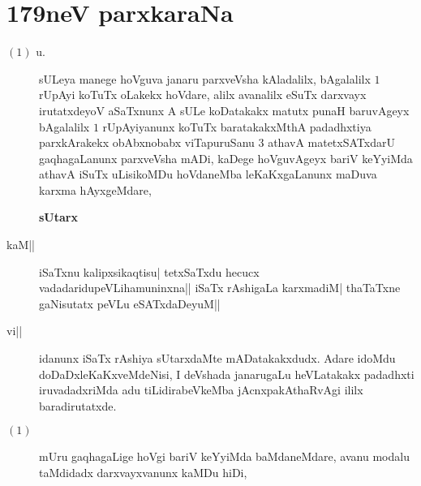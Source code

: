 \chapter{179neV parxkaraNa}


\begin{description}
\item[$(1)$ u.] sULeya manege hoVguva janaru parxveVsha kAladalilx,
bAgalalilx $1$ rUpAyi koTuTx oLakekx hoVdare, alilx avanalilx eSuTx
darxvayx irutatxdeyoV aSaTxnunx A sULe koDatakakx matutx punaH
baruvAgeyx bAgalalilx $1$ rUpAyiyanunx koTuTx baratakakxMthA padadhxtiya
parxkArakekx obAbxnobabx viTapuruSanu $3$ athavA matetxSATxdarU
gaqhagaLanunx parxveVsha mADi, kaDege hoVguvAgeyx bariV keYyiMda
athavA iSuTx uLisikoMDu hoVdaneMba leKaKxgaLanunx maDuva karxma
hAyxgeMdare,

\centerline{\bf \Large sUtarx}

\item[kaM||] iSaTxnu kalipxsikaqtisu| tetxSaTxdu hecucx
vadadaridupeVLihamuninxna|| iSaTx rAshigaLa karxmadiM| thaTaTxne
gaNisutatx peVLu eSATxdaDeyuM||

\item[vi||] idanunx iSaTx rAshiya sUtarxdaMte mADatakakxdudx. Adare
idoMdu doDaDxleKaKxveMdeNisi, I deVshada janarugaLu heVLatakakx
padadhxti iruvadadxriMda adu tiLidirabeVkeMba jAcnxpakAthaRvAgi ililx
baradirutatxde. 

\item[$(1)$] mUru gaqhagaLige hoVgi bariV keYyiMda baMdaneMdare, avanu
modalu taMdidadx darxvayxvanunx kaMDu hiDi,


\end{description}
